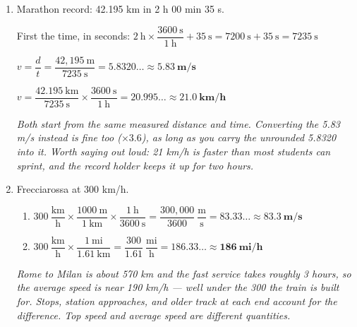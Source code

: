 \documentclass[12pt, twoside]{article}
\begin{document}
\begin{enumerate}[itemsep=0.25cm]
\begin{enumerate}[itemsep=0.15cm]
      \emph{The published height is 541.3 m, so this checks. Note that 1776 ft is not a
      measurement at all --- the height was chosen to match the year, so the number is
      exact by design and every digit means something. The 3.28 is the rounded factor
      here, and it is what limits the answer to three figures.}
    \item $40~\text{nickels} \times \dfrac{5.000~\text{g}}{1~\text{nickel}}
      \times \dfrac{1~\text{kg}}{1000~\text{g}} = \mathbf{0.2000~\textbf{kg}}$

      \emph{Keep all four figures: the mint specification is exact to four decimal places
      of a gram and the count of 40 is exact, so nothing here forces rounding. This is why
      a nickel makes a free calibration check for a classroom balance.}
  \end{enumerate}

\item Marathon record: 42.195 km in 2 h 00 min 35 s.

  First the time, in seconds: $2~\text{h} \times \dfrac{3600~\text{s}}{1~\text{h}}
  + 35~\text{s} = 7200~\text{s} + 35~\text{s} = 7235~\text{s}$

  $v = \dfrac{d}{t} = \dfrac{42{,}195~\text{m}}{7235~\text{s}} = 5.8320\ldots
  \approx \mathbf{5.83~\textbf{m/s}}$

  $v = \dfrac{42.195~\text{km}}{7235~\text{s}} \times \dfrac{3600~\text{s}}{1~\text{h}}
  = 20.995\ldots \approx \mathbf{21.0~\textbf{km/h}}$

  \emph{Both start from the same measured distance and time. Converting the 5.83 m/s
  instead is fine too ($\times 3.6$), as long as you carry the unrounded 5.8320 into it.
  Worth saying out loud: 21 km/h is faster than most students can sprint, and the record
  holder keeps it up for two hours.}

\item Frecciarossa at 300 km/h.
  \begin{enumerate}[itemsep=0.15cm]
    \item $300~\dfrac{\text{km}}{\text{h}} \times \dfrac{1000~\text{m}}{1~\text{km}}
      \times \dfrac{1~\text{h}}{3600~\text{s}}
      = \dfrac{300{,}000}{3600}~\dfrac{\text{m}}{\text{s}} = 83.33\ldots
      \approx \mathbf{83.3~\textbf{m/s}}$
    \item $300~\dfrac{\text{km}}{\text{h}} \times \dfrac{1~\text{mi}}{1.61~\text{km}}
      = \dfrac{300}{1.61}~\dfrac{\text{mi}}{\text{h}} = 186.33\ldots
      \approx \mathbf{186~\textbf{mi/h}}$
  \end{enumerate}
  \emph{Rome to Milan is about 570 km and the fast service takes roughly 3 hours, so the
  \emph{average} speed is near 190 km/h --- well under the 300 the train is built for.
  Stops, station approaches, and older track at each end account for the difference. Top
  speed and average speed are different quantities.}


\end{enumerate}
\end{document}
